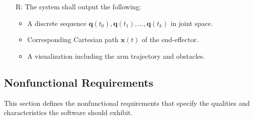 \documentclass[12pt]{article}
\newcounter{reqnum} %
\begin{document}
\begin{itemize}
  \item[R\refstepcounter{reqnum}\thereqnum \label{R_Output}:]  
    The system shall output the following:
    \begin{itemize}
      \item A discrete sequence \( \mathbf{q}(t_0), \mathbf{q}(t_1), \dots, \mathbf{q}(t_k) \) in joint space.
      \item Corresponding Cartesian path \( \mathbf{x}(t) \) of the end-effector.
      \item A visualization including the arm trajectory and obstacles.
    \end{itemize}
    

\end{itemize}



  
  \subsection{Nonfunctional Requirements}

  This section defines the nonfunctional requirements that specify the qualities and characteristics the software should exhibit.
  
\end{document}
